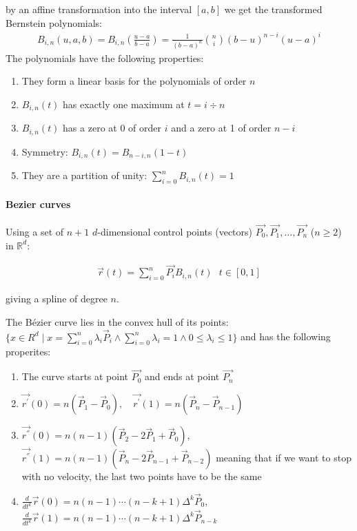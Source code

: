 by an affine transformation into the interval $[a,b]$ we get the transformed Bernstein polynomials:
\begin{align*}
	B_{i,n}(u,a,b) = B_{i,n}\left(\frac{u-a}{b-a}\right)
	= \frac{1}{(b-a)^n}\binom{n}{i}(b-u)^{n-i}(u-a)^i
\end{align*}
The polynomials have the following properties:
\begin{enumerate}
	\item They form a linear basis for the polynomials of order $n$
	\item $B_{i,n}(t)$ has exactly one maximum at $t = i\div n$
	\item $B_{i,n}(t)$ has a zero at 0 of order $i$ and a zero at 1 of order $n-i$
	\item Symmetry: $B_{i,n}(t) = B_{n-i,n}(1 - t)$
	\item They are a partition of unity: $\sum_{i=0}^n B_{i,n}(t) = 1$
\end{enumerate}

\paragraph{Bezier curves}
Using a set of $n+1$ $d$-dimensional control points (vectors) $\vec{P_0}, \vec{P_1}, \ldots, \vec{P_n}$ ($n\geq 2$) in $\mathbb{R}^d$:
\begin{snugshade*}
	\begin{align*}
		\vec{r}(t) = \sum_{i=0}^n \vec{P_i}B_{i,n}(t)\ \ \ t\in[0,1]
	\end{align*}
\end{snugshade*}
giving a spline of degree $n$.

The B\'ezier curve lies in the convex hull of its points:
$\{x\in R^{d}\mid x=\sum_{i=0}^{n}\lambda_{i}{\vec{P}}_{i}\wedge\sum_{i=0}^{n}\lambda_{i}=1\wedge 0\leq\lambda_{i}\leq1\}$
and has the following properites:
\begin{enumerate}
	\item The curve starts at point $\vec{P_0}$ and ends at point $\vec{P_n}$
	\item $\vec{r^{\prime}}(0) = n(\vec{P}_{1}-\vec{P}_{0}), \quad\vec{r^{\prime}}(1)=n(\vec{P}_{n}-\vec{P}_{n-1})$
	\item{
		$\vec{r^{''}}(0) = n(n-1)(\vec{P}_{2}-2\vec{P}_{1}+\vec{P}_{0})$,
		$\vec{r^{''}}(1)=n(n-1)(\vec{P}_{n}-2\vec{P}_{n-1}+\vec{P}_{n-2})$
		meaning that if we want to stop with no velocity, the last two points have to be the same
	}
	\item{
		$\frac{d}{d t^{k}}\vec{r}(0) = n(n-1)\cdots(n-k+1)\Delta^{k}\vec{P}_{0}$,
		$\frac{d}{d t^{k}}\vec{r}(1)=n(n-1)\cdots(n-k+1)\Delta^{k}\vec{P}_{n-k}$
	}
\end{enumerate}

